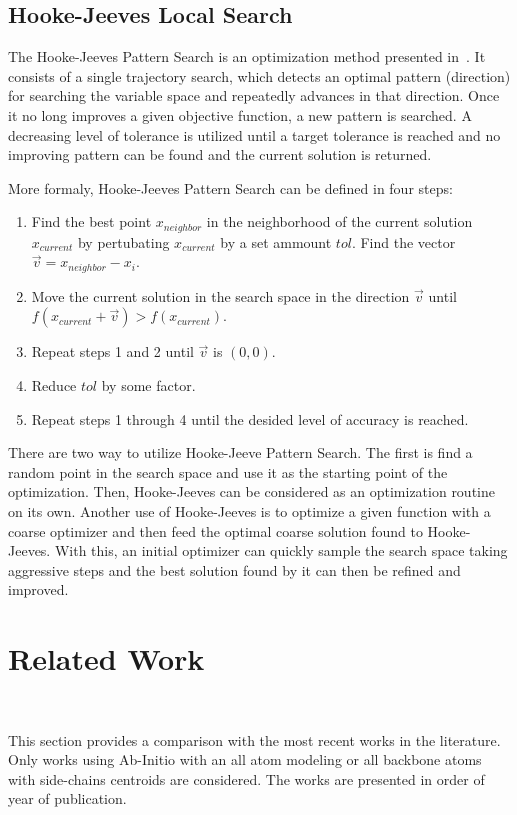 \subsection{Hooke-Jeeves Local Search}

The Hooke-Jeeves Pattern Search is an optimization method presented
in~\cite{hooke1961direct}. It consists of a single trajectory search, which
detects an optimal pattern (direction) for searching the variable space and
repeatedly advances in that direction. Once it no long improves a given
objective function, a new pattern is searched. A decreasing level of tolerance
is utilized until a target tolerance is reached and no improving pattern can be
found and the current solution is returned.

More formaly, Hooke-Jeeves Pattern Search can be defined in four steps:
\begin{enumerate}
    \item Find the best point $x_{neighbor}$ in the neighborhood of the current
    solution $x_{current}$ by pertubating $x_{current}$ by a set ammount $tol$.
    Find the vector $\vec{v} = x_{neighbor} - x_i$.
    \item Move the current solution in the search space in the direction $\vec{v}$
    until $f(x_{current} + \vec{v}) > f(x_{current})$.
    \item Repeat steps 1 and 2 until $\vec{v}$ is $(0, 0)$.
    \item Reduce $tol$ by some factor.
    \item Repeat steps 1 through 4 until the desided level of accuracy is reached.
\end{enumerate}

There are two way to utilize Hooke-Jeeve Pattern Search. The first is find a
random point in the search space and use it as the starting point of the optimization.
Then, Hooke-Jeeves can be considered as an optimization routine on its own. Another
use of Hooke-Jeeves is to optimize a given function with a coarse optimizer and then
feed the optimal coarse solution found to Hooke-Jeeves. With this, an initial
optimizer can quickly sample the search space taking aggressive steps and the best
solution found by it can then be refined and improved.

\section{Related Work}~\label{sec:related_works}

This section provides a comparison with the most recent works in the literature.
Only works using Ab-Initio with an all atom modeling or all backbone atoms with
side-chains centroids are considered. The works are presented in order of year
of publication.

